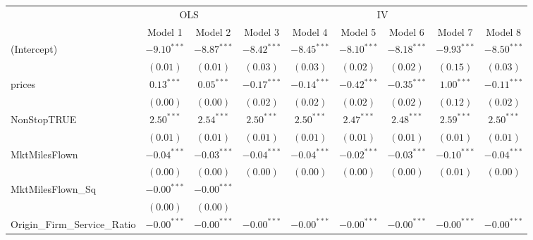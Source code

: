
\begin{table}
\begin{center}
\begin{tabular}{l c c c c c c c c}
\hline
 & \multicolumn{2}{c}{OLS} & \multicolumn{6}{c}{IV} \\
\cline{2-3} \cline{4-9}
 & Model 1 & Model 2 & Model 3 & Model 4 & Model 5 & Model 6 & Model 7 & Model 8 \\
\hline
(Intercept)                  & $-9.10^{***}$ & $-8.87^{***}$ & $-8.42^{***}$ & $-8.45^{***}$ & $-8.10^{***}$ & $-8.18^{***}$ & $-9.93^{***}$ & $-8.50^{***}$ \\
                             & $(0.01)$      & $(0.01)$      & $(0.03)$      & $(0.03)$      & $(0.02)$      & $(0.02)$      & $(0.15)$      & $(0.03)$      \\
prices                       & $0.13^{***}$  & $0.05^{***}$  & $-0.17^{***}$ & $-0.14^{***}$ & $-0.42^{***}$ & $-0.35^{***}$ & $1.00^{***}$  & $-0.11^{***}$ \\
                             & $(0.00)$      & $(0.00)$      & $(0.02)$      & $(0.02)$      & $(0.02)$      & $(0.02)$      & $(0.12)$      & $(0.02)$      \\
NonStopTRUE                  & $2.50^{***}$  & $2.54^{***}$  & $2.50^{***}$  & $2.50^{***}$  & $2.47^{***}$  & $2.48^{***}$  & $2.59^{***}$  & $2.50^{***}$  \\
                             & $(0.01)$      & $(0.01)$      & $(0.01)$      & $(0.01)$      & $(0.01)$      & $(0.01)$      & $(0.01)$      & $(0.01)$      \\
MktMilesFlown                & $-0.04^{***}$ & $-0.03^{***}$ & $-0.04^{***}$ & $-0.04^{***}$ & $-0.02^{***}$ & $-0.03^{***}$ & $-0.10^{***}$ & $-0.04^{***}$ \\
                             & $(0.00)$      & $(0.00)$      & $(0.00)$      & $(0.00)$      & $(0.00)$      & $(0.00)$      & $(0.01)$      & $(0.00)$      \\
MktMilesFlown\_Sq            & $-0.00^{***}$ & $-0.00^{***}$ &               &               &               &               &               &               \\
                             & $(0.00)$      & $(0.00)$      &               &               &               &               &               &               \\
Origin\_Firm\_Service\_Ratio & $-0.00^{***}$ & $-0.00^{***}$ & $-0.00^{***}$ & $-0.00^{***}$ & $-0.00^{***}$ & $-0.00^{***}$ & $-0.00^{***}$ & $-0.00^{***}$ \\

\end{tabular}
\end{center}
\end{table}
